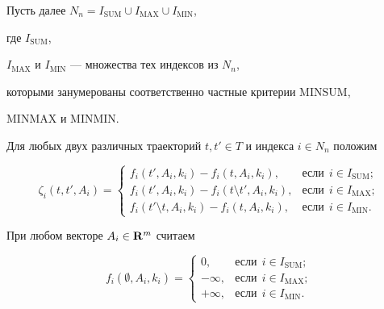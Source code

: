 Пусть далее $N_n=I_{\mathrm{SUM}}\cup I_{\mathrm{MAX}}\cup I_{\mathrm{MIN}}$,


где $I_{\mathrm{SUM}}$,


$I_{\mathrm{MAX}}$ и $I_{\mathrm{MIN}}$ --- множества тех индексов из $N_n$,


которыми занумерованы соответственно частные критерии MINSUM,


MINMAX и MINMIN.





Для любых двух различных траекторий $t, t'\in T$ и индекса $i \in


N_n$ положим


$$


\zeta_i(t, t', A_i)=


\begin{cases}


f_i(t', A_i, k_i)-f_i( t, A_i, k_i), & \text{если}\ \ i\in I_{\mathrm{SUM}}; \\


f_i(t', A_i, k_i)-f_i( t\setminus t', A_i, k_i), &


\text{если}\ \ i\in I_{\mathrm{MAX}}; \\


f_i( t' \setminus t, A_i, k_i)-f_i(t, A_i, k_i), & \text{если}\ \ i\in


I_{\mathrm{MIN}}.


\end{cases}


$$


При любом векторе $A_i\in\bold{R}^m$ считаем


$$


f_i(\emptyset , A_i, k_i)=


\begin{cases}


0, & \text{если}\ \ i\in I_{\mathrm{SUM}}; \\


-\infty, & \text{если}\ \ i\in I_{\mathrm{MAX}}; \\


+\infty, & \text{если}\ \ i\in I_{\mathrm{MIN}}.


\end{cases}


$$






